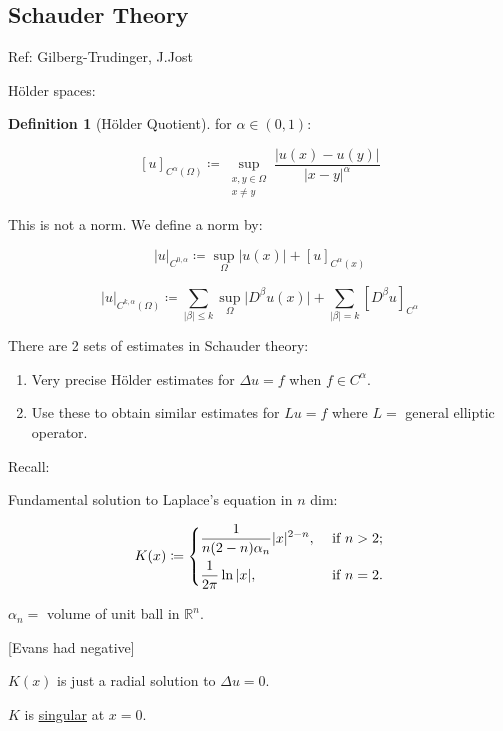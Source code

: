 \documentclass{article}
\theoremstyle{definition}
\newtheorem{definition}{Definition}
\begin{document}
\subsection*{Schauder Theory}

Ref: Gilberg-Trudinger, J.Jost

H\"older spaces:

\begin{definition}
    [H\"older Quotient] for \(\alpha \in (0,1)\):

    \[
        [u]_{C^\alpha (\Omega)} \coloneqq \sup_{\substack{x,y\in \Omega \\ x\neq y}} \frac{\vert u(x) - u(y) \vert}{\vert x-y \vert ^\alpha}
    \]
\end{definition}

This is not a norm. We define a norm by:

\[
    \vert u \vert _{C^{0,\alpha}} \coloneqq \sup_\Omega \vert u(x) \vert + [u]_{C^\alpha(x)}
\]

\[
    \vert u \vert _{C^{k,\alpha}(\Omega)} \coloneqq \sum_{\vert \beta \vert \leq k} \sup_{\Omega} \vert D^\beta u(x) \vert + \sum_{\vert \beta \vert = k} [D^\beta u]_{C^{\alpha}}
\]

There are 2 sets of estimates in Schauder theory:

\begin{enumerate}[label=\arabic*)]
    \item Very precise H\"older estimates for \(\Delta u = f\) when \(f\in C^\alpha\).
    \item Use these to obtain similar estimates for \(L u = f\) where \(L =\) general elliptic operator.
\end{enumerate} 

Recall:

Fundamental solution to Laplace's equation in \(n\) dim:

\[
    K(x) \coloneqq \begin{dcases}
        \frac{1}{n(2-n) \alpha_n} \vert x \vert ^{2-n}, &\text{ if } n > 2 ;\\
        \frac{1}{2\pi}\ln \vert x \vert , &\text{ if } n = 2 .
    \end{dcases}
\]

\(\alpha_n =\) volume of unit ball in \(\mathbb{R}^n\).

[Evans had negative]

\(K(x)\) is just a radial solution to \(\Delta u = 0\).

\(K\) is \underline{singular} at \(x=0\).
\end{document}
